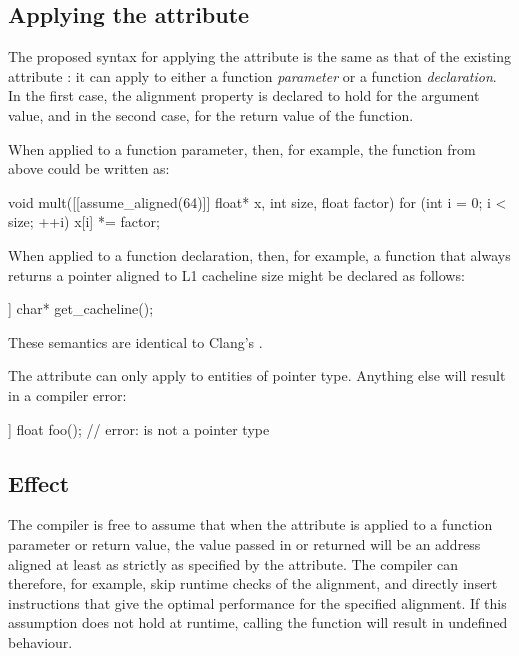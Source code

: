 \subsection{Applying the attribute}
The proposed syntax for applying the attribute  is the same as that of the existing attribute : it can apply to either a function \emph{parameter} or a function \emph{declaration}. In the first case, the alignment property is declared to hold for the argument value, and in the second case, for the return value of the function.

When applied to a function parameter, then, for example, the function  from above could be written as:

\begin{codeblock}
void mult([[assume_aligned(64)]] float* x, int size, float factor)
{    
    for (int i = 0; i < size; ++i)
        x[i] *= factor;
}
\end{codeblock}

When applied to a function declaration, then, for example, a function that always returns a pointer aligned to L1 cacheline size might be declared as follows:

\begin{codeblock}
[[assume_aligned(std::hardware_destructive_interference_size)]] char* get_cacheline();
\end{codeblock}

These semantics are identical to Clang's .

The attribute can only apply to entities of pointer type. Anything else will result in a compiler error:

\begin{codeblock}
[[assume_aligned(64)]] float foo();  // error:  is not a pointer type
\end{codeblock}

\subsection{Effect}

The compiler is free to assume that when the attribute is applied to a function parameter or return value, the value passed in or returned will be an address aligned at least as strictly as specified by the attribute. The compiler can therefore, for example, skip runtime checks of the alignment, and directly insert instructions that give the optimal performance for the specified alignment. If this assumption does not hold at runtime, calling the function will result in undefined behaviour.



